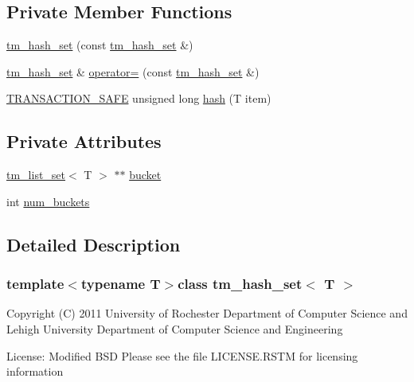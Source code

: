 \subsection*{Private Member Functions}
\begin{DoxyCompactItemize}
\item 
\hyperlink{classtm__hash__set_a1da9b8652e62e4c89728f32c67eb6ad0}{tm\-\_\-hash\-\_\-set} (const \hyperlink{classtm__hash__set}{tm\-\_\-hash\-\_\-set} \&)
\item 
\hyperlink{classtm__hash__set}{tm\-\_\-hash\-\_\-set} \& \hyperlink{classtm__hash__set_aa1bca20dff8fcb350602bf41d823a620}{operator=} (const \hyperlink{classtm__hash__set}{tm\-\_\-hash\-\_\-set} \&)
\item 
\hyperlink{common_8hpp_a77872cb9748b204f4b1c44ba6141b862}{T\-R\-A\-N\-S\-A\-C\-T\-I\-O\-N\-\_\-\-S\-A\-F\-E} unsigned long \hyperlink{classtm__hash__set_af47f2a70fe6da64578c23fa42fa33ca5}{hash} (T item)
\end{DoxyCompactItemize}
\subsection*{Private Attributes}
\begin{DoxyCompactItemize}
\item 
\hyperlink{classtm__list__set}{tm\-\_\-list\-\_\-set}$<$ T $>$ $\ast$$\ast$ \hyperlink{classtm__hash__set_a636e29c090577e85953d1a45dc353567}{bucket}
\item 
int \hyperlink{classtm__hash__set_a5cd1ca63b5defd3cae98ec2a3ff7f521}{num\-\_\-buckets}
\end{DoxyCompactItemize}


\subsection{Detailed Description}
\subsubsection*{template$<$typename T$>$class tm\-\_\-hash\-\_\-set$<$ T $>$}

Copyright (C) 2011 University of Rochester Department of Computer Science and Lehigh University Department of Computer Science and Engineering

License\-: Modified B\-S\-D Please see the file L\-I\-C\-E\-N\-S\-E.\-R\-S\-T\-M for licensing information 

